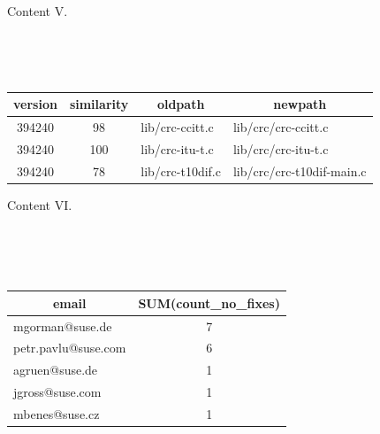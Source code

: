 \begin{frame}{}{Content V.}

   \\

  \pause

  \begin{block}{ \\
      }
    \pause
    \begin{center}
      \begin{tabular}{|c|c|l|l|} \hline
	\bf version & \bf similarity & \multicolumn{1}{c|}{\bf oldpath} &
	  \multicolumn{1}{c|}{\bf newpath} \\ \hline
	394240 & 98 & lib/crc-ccitt.c & lib/crc/crc-ccitt.c \\ \hline
	394240 & 100 & lib/crc-itu-t.c & lib/crc/crc-itu-t.c \\ \hline
	394240 & 78 & lib/crc-t10dif.c & lib/crc/crc-t10dif-main.c \\ \hline
      \end{tabular}
    \end{center}
  \end{block}

\end{frame}

\begin{frame}{}{Content VI.}


  \pause

  \begin{block}{ \\
       \\
      ~~~~ \\
      }
    \pause
    \begin{center}
      \begin{tabular}{|l|c|} \hline
	\multicolumn{1}{|c|}{\bf email} & \bf SUM(count\_no\_fixes) \\ \hline
	mgorman@suse.de & 7 \\ \hline
	petr.pavlu@suse.com & 6 \\ \hline
	agruen@suse.de & 1 \\ \hline
	jgross@suse.com & 1 \\ \hline
	mbenes@suse.cz & 1 \\ \hline
      \end{tabular}
    \end{center}
  \end{block}

\end{frame}

